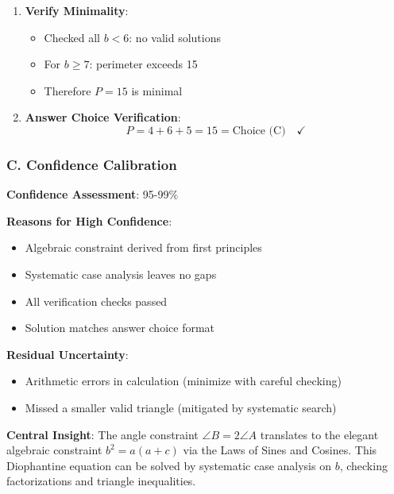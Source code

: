 \documentclass[12pt]{article}
\begin{document}
\begin{verificationbox}
\begin{enumerate}
    \item \textbf{Verify Minimality}:
    \begin{itemize}
        \item Checked all $b < 6$: no valid solutions
        \item For $b \geq 7$: perimeter exceeds 15
        \item Therefore $P = 15$ is minimal \quad \checkmark
    \end{itemize}
    
    \item \textbf{Answer Choice Verification}:
    $$P = 4 + 6 + 5 = 15 = \text{Choice (C)} \quad \checkmark$$
\end{enumerate}

\subsubsection*{C. Confidence Calibration}

\textbf{Confidence Assessment}: 95-99\%

\textbf{Reasons for High Confidence}:
\begin{itemize}
    \item Algebraic constraint derived from first principles
    \item Systematic case analysis leaves no gaps
    \item All verification checks passed
    \item Solution matches answer choice format
\end{itemize}

\textbf{Residual Uncertainty}:
\begin{itemize}
    \item Arithmetic errors in calculation (minimize with careful checking)
    \item Missed a smaller valid triangle (mitigated by systematic search)
\end{itemize}

\end{verificationbox}

\begin{keyinsight}
\textbf{Central Insight}: The angle constraint $\angle B = 2\angle A$ translates to the elegant algebraic constraint $b^2 = a(a+c)$ via the Laws of Sines and Cosines. This Diophantine equation can be solved by systematic case analysis on $b$, checking factorizations and triangle inequalities.
\end{keyinsight}
\end{document}
